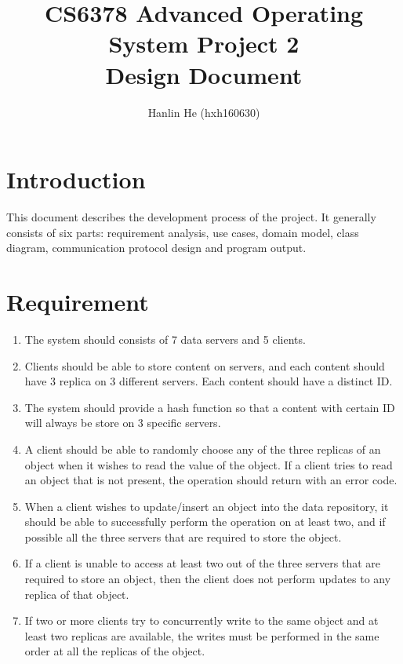 \documentclass[11pt,letterpaper,en-US]{article}
\title{CS6378 Advanced Operating System Project 2 \\Design Document}
\author{Hanlin He (hxh160630)}
\begin{document}
\maketitle

\section{Introduction}
This document describes the development process of the project.
It generally consists of six parts:
requirement analysis,
use cases,
domain model,
class diagram,
communication protocol design
and program output.

\section{Requirement}
\begin{enumerate}
    \item The system should consists of 7 data servers
        and 5 clients.
    \item Clients should be able to store content on servers,
        and each content should have 3 replica on 3 different servers.
        Each content should have a distinct ID.
    \item The system should provide a hash function so that
        a content with certain ID will always be store on 3
        specific servers.
    \item A client should be able to randomly choose any of the
        three replicas of an object when it wishes to read the
        value of the object.
        If a client tries to read an object that is not present,
        the operation should return with an error code.
    \item When a client wishes to update/insert an object into
        the data repository, it should be able to successfully
        perform the operation on at least two, and if possible
        all the three servers that are required to store the object.
    \item If a client is unable to access at least two out of the
        three servers that are required to store an object, then
        the client does not perform updates to any replica of
        that object.
    \item If two or more clients try to concurrently write to
        the same object and at least two replicas are available,
        the writes must be performed in the same order at all
        the replicas of the object.
\end{enumerate}
\end{document}
